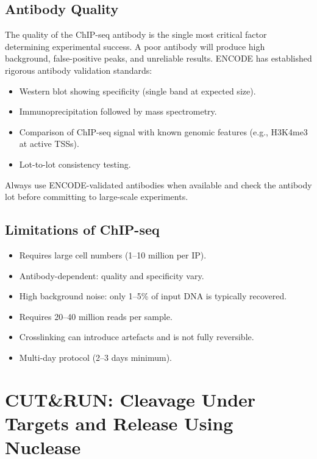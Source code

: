 \subsection{Antibody Quality}
\label{subsec:histones:antibody}

\begin{warningbox}
The quality of the ChIP-seq antibody is the single most critical factor determining experimental success. A poor antibody will produce high background, false-positive peaks, and unreliable results. ENCODE has established rigorous antibody validation standards:
\begin{itemize}[itemsep=1pt]
  \item Western blot showing specificity (single band at expected size).
  \item Immunoprecipitation followed by mass spectrometry.
  \item Comparison of ChIP-seq signal with known genomic features (e.g., H3K4me3 at active TSSs).
  \item Lot-to-lot consistency testing.
\end{itemize}
Always use ENCODE-validated antibodies when available and check the antibody lot before committing to large-scale experiments.
\end{warningbox}

\subsection{Limitations of ChIP-seq}
\label{subsec:histones:chipseq-limitations}

\begin{itemize}[itemsep=2pt]
  \item Requires large cell numbers (1--10 million per IP).
  \item Antibody-dependent: quality and specificity vary.
  \item High background noise: only 1--5\% of input DNA is typically recovered.
  \item Requires 20--40 million reads per sample.
  \item Crosslinking can introduce artefacts and is not fully reversible.
  \item Multi-day protocol (2--3 days minimum).
\end{itemize}

\section{CUT\&RUN: Cleavage Under Targets and Release Using Nuclease}
\label{sec:histones:cutrun}

